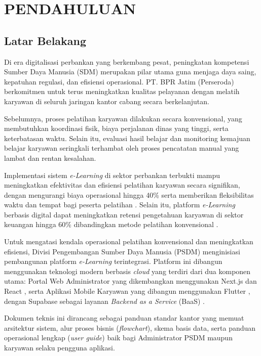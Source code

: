 \chapter{PENDAHULUAN}

\section{Latar Belakang}
Di era digitalisasi perbankan yang berkembang pesat, peningkatan kompetensi Sumber Daya Manusia (SDM) merupakan pilar utama guna menjaga daya saing, kepatuhan regulasi, dan efisiensi operasional. PT. BPR Jatim (Perseroda) berkomitmen untuk terus meningkatkan kualitas pelayanan dengan melatih karyawan di seluruh jaringan kantor cabang secara berkelanjutan.

Sebelumnya, proses pelatihan karyawan dilakukan secara konvensional, yang membutuhkan koordinasi fisik, biaya perjalanan dinas yang tinggi, serta keterbatasan waktu. Selain itu, evaluasi hasil belajar dan monitoring kemajuan belajar karyawan seringkali terhambat oleh proses pencatatan manual yang lambat dan rentan kesalahan.

Implementasi sistem \textit{e-Learning} di sektor perbankan terbukti mampu meningkatkan efektivitas dan efisiensi pelatihan karyawan secara signifikan, dengan mengurangi biaya operasional hingga 40\% serta memberikan fleksibilitas waktu dan tempat bagi peserta pelatihan \cite{wahyudi2021}. Selain itu, platform \textit{e-Learning} berbasis digital dapat meningkatkan retensi pengetahuan karyawan di sektor keuangan hingga 60\% dibandingkan metode pelatihan konvensional \cite{elearning_banking}.

Untuk mengatasi kendala operasional pelatihan konvensional dan meningkatkan efisiensi, Divisi Pengembangan Sumber Daya Manusia (PSDM) menginisiasi pembangunan platform \textit{e-Learning} terintegrasi. Platform ini dibangun menggunakan teknologi modern berbasis \textit{cloud} yang terdiri dari dua komponen utama: Portal Web Administrator yang dikembangkan menggunakan Next.js dan React \cite{nextjs_journal}, serta Aplikasi Mobile Karyawan yang dibangun menggunakan Flutter \cite{flutter_journal}, dengan Supabase sebagai layanan \textit{Backend as a Service} (BaaS) \cite{supabase_journal}.

Dokumen teknis ini dirancang sebagai panduan standar kantor yang memuat arsitektur sistem, alur proses bisnis (\textit{flowchart}), skema basis data, serta panduan operasional lengkap (\textit{user guide}) baik bagi Administrator PSDM maupun karyawan selaku pengguna aplikasi.

